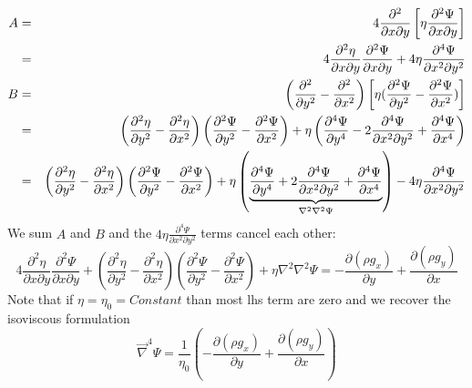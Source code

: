 \begin{eqnarray}
A &=& 4\frac{\partial^2 }{\partial x \partial y} 
\left[\eta \frac{\partial^2 \Psi}{\partial x \partial y}  \right] \nonumber\\
&=&
4\frac{\partial^2 \eta }{\partial x \partial y} \frac{\partial^2 \Psi}{\partial x \partial y} 
+4 \eta \frac{\partial^4 \Psi}{\partial x^2 \partial y^2} \nonumber\\
B &=&
\left( 
\frac{\partial^2 }{\partial y^2}
- \frac{\partial^2 }{\partial x^2}
\right)
\left[ \eta (\frac{\partial^2 \Psi}{\partial y^2}-\frac{\partial^2 \Psi}{\partial x^2}) \right] \nonumber\\
&=&
\left( 
\frac{\partial^2 \eta}{\partial y^2}
- \frac{\partial^2 \eta}{\partial x^2}
\right)
\left( \frac{\partial^2 \Psi}{\partial y^2}-\frac{\partial^2 \Psi}{\partial x^2} \right)
+ \eta 
\left( \frac{\partial^4 \Psi}{\partial y^4} - 2 \frac{\partial^4 \Psi}{\partial x^2\partial y^2} +
\frac{\partial^4 \Psi}{\partial x^4} \right) \nonumber\\
&=&
\left( 
\frac{\partial^2 \eta}{\partial y^2}
- \frac{\partial^2 \eta}{\partial x^2}
\right)
\left( \frac{\partial^2 \Psi}{\partial y^2}-\frac{\partial^2 \Psi}{\partial x^2} \right)
+ \eta 
\left( \underbrace{\frac{\partial^4 \Psi}{\partial y^4} + 2 \frac{\partial^4 \Psi}{\partial x^2\partial y^2} +
\frac{\partial^4 \Psi}{\partial x^4} }_{\nabla^2\nabla^2 \Psi}\right) 
- 4 \eta \frac{\partial^4 \Psi}{\partial x^2\partial y^2}
\nonumber\\
\end{eqnarray}
We sum $A$ and $B$ and the $4\eta  \frac{\partial^4 \Psi}{\partial x^2\partial y^2}$ terms cancel each other:
\[
4\frac{\partial^2 \eta }{\partial x \partial y} \frac{\partial^2 \Psi}{\partial x \partial y} 
+\left( 
\frac{\partial^2 \eta}{\partial y^2}
- \frac{\partial^2 \eta}{\partial x^2}
\right)
\left( \frac{\partial^2 \Psi}{\partial y^2}-\frac{\partial^2 \Psi}{\partial x^2} \right)
+\eta \nabla^2\nabla^2 \Psi 
= 
- \frac{\partial (\rho g_x)}{\partial y}
+ \frac{\partial (\rho g_y)}{\partial x}
\]
Note that if $\eta=\eta_0=Constant$ than most lhs term are zero and we recover 
the isoviscous formulation
\begin{equation}
\vec\nabla^4 \Psi = \frac{1}{\eta_0} \left( -\frac{\partial (\rho g_x)}{\partial y}
+\frac{\partial (\rho g_y)}{\partial x} \right)
\end{equation}





